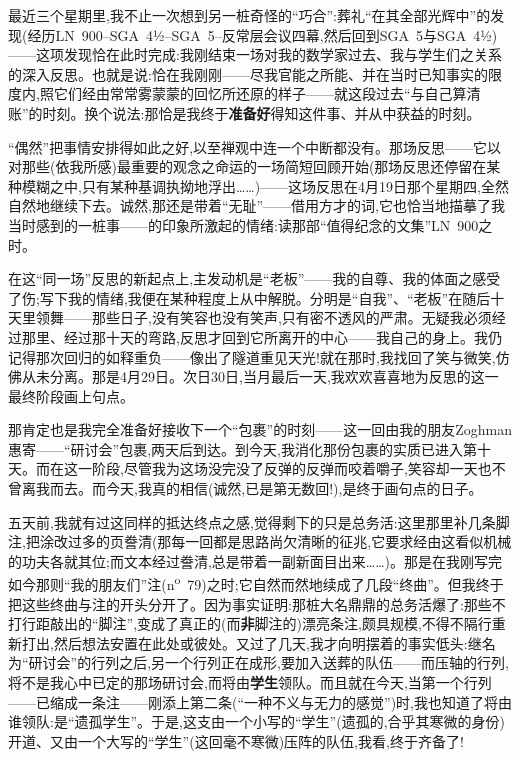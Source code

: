 最近三个星期里,我不止一次想到另一桩奇怪的“巧合”:葬礼“在其全部光辉中”的发现(经历LN~900--SGA~4½--SGA~5--反常层会议四幕,然后回到SGA~5与SGA~4½)——这项发现恰在此时完成:我刚结束一场对我的数学家过去、我与学生们之关系的深入反思。也就是说:恰在我刚刚——尽我官能之所能、并在当时已知事实的限度内,照它们经由常常雾蒙蒙的回忆所还原的样子——就这段过去“与自己算清账”的时刻\dmark{}。换个说法:那恰是我终于\textbf{准备好}得知这件事、并从中获益的时刻。

“偶然”把事情安排得如此之好,以至禅观中连一个中断都没有。那场反思——它以对那些(依我所感)最重要的观念之命运的一场简短回顾开始(那场反思还停留在某种模糊之中,只有某种基调执拗地浮出……)——这场反思在4月19日那个星期四,全然自然地继续下去。诚然,那还是带着“无耻”——借用方才的词,它也恰当地描摹了我当时感到的一桩事——的印象所激起的情绪:读那部“值得纪念的文集”LN~900之时。

在这“同一场”反思的新起点上,主发动机是“老板”——我的自尊、我的体面之感受了伤;写下我的情绪,我便在某种程度上从中解脱。分明是“自我”、“老板”在随后十天里领舞——那些日子,没有笑容也没有笑声,只有密不透风的严肃。无疑我必须经过那里、经过那十天的弯路,反思才回到它所离开的中心——我自己的身上。我仍记得那次回归的如释重负——像出了隧道重见天光!就在那时,我找回了笑与微笑,仿佛从未分离。那是4月29日。次日30日,当月最后一天,我欢欢喜喜地为反思的这一最终阶段画上句点。

那肯定也是我完全准备好接收下一个“包裹”的时刻——这一回由我的朋友Zoghman惠寄——“研讨会”包裹,两天后到达。到今天,我消化那份包裹的实质已进入第十天。而在这一阶段,尽管我为这场没完没了反弹的反弹而咬着嚼子,笑容却一天也不曾离我而去。而今天,我真的相信(诚然,已是第无数回!),是终于画句点的日子。

五天前,我就有过这同样的抵达终点之感,觉得剩下的只是总务活:这里那里补几条脚注,把涂改过多的页誊清\dmark{}(那每一回都是思路尚欠清晰的征兆,它要求经由这看似机械的功夫各就其位;而文本经过誊清,总是带着一副新面目出来……)。那是在我刚写完如今那则“我的朋友们”注(n\textsuperscript{o}~79)之时;它自然而然地续成了几段“终曲”。但我终于把这些终曲与注的开头分开了。因为事实证明:那桩大名鼎鼎的总务活爆了:那些不打行距敲出的“脚注”,变成了真正的(而\textbf{非}脚注的)漂亮条注,颇具规模,不得不隔行重新打出,然后想法安置在此处或彼处。又过了几天,我才向明摆着的事实低头:继名为“研讨会”的行列之后,另一个行列正在成形,要加入送葬的队伍——而压轴的行列,将不是我心中已定的那场研讨会,而将由\textbf{学生}领队。而且就在今天,当第一个行列——已缩成一条注——刚添上第二条(“一种不义与无力的感觉”)时,我也知道了将由谁领队:是“遗孤学生”。于是,这支由一个小写的“学生”(遗孤的,合乎其寒微的身份)开道、又由一个大写的“学生”(这回毫不寒微)压阵的队伍,我看,终于齐备了!

